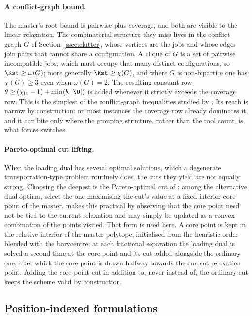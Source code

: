 \paragraph{A conflict-graph bound.}
The master's root bound is pairwise plus coverage, and both are visible to the linear
relaxation. The combinatorial structure they miss lives in the conflict graph $G$ of
Section~\ref{ssec:clutter}, whose vertices are the jobs and whose edges join pairs
that cannot share a configuration. A clique of $G$ is a set of pairwise incompatible
jobs, which must occupy that many distinct configurations, so $\Kst\ge\omega(G)$; more
generally $\Kst\ge\chi(G)$, and where $G$ is non-bipartite one has $\chi(G)\ge3$ even
when $\omega(G)=2$. The resulting constant row
$\theta\ge(\chi_{\mathrm{lb}}-1)+\min(b,\lvert\U\rvert)$ is added whenever it strictly
exceeds the coverage row. This is the simplest of the conflict-graph inequalities studied by
\citet{Atamturk2000}. Its reach is narrow by construction: on most instances the
coverage row already dominates it, and it can bite only where the grouping structure,
rather than the tool count, is what forces switches.

\paragraph{Pareto-optimal cut lifting.}
When the loading dual has several optimal solutions, which a degenerate
transportation-type problem routinely does, the cuts they yield are not equally
strong. Choosing the deepest is the Pareto-optimal cut of \citet{MagnantiWong1981}:
among the alternative dual optima, select the one maximising the cut's value at a fixed
interior core point of the master. \citet{Papadakos2008} makes this practical by
observing that the core point need not be tied to the current relaxation and may simply
be updated as a convex combination of the points visited. That form is used here. A
core point is kept in the relative interior of the master polytope, initialised from
the heuristic order blended with the barycentre; at each fractional separation the
loading dual is solved a second time at the core point and its cut added alongside the
ordinary one, after which the core point is drawn halfway towards the current
relaxation point. Adding the core-point cut in addition to, never instead of, the
ordinary cut keeps the scheme valid by construction.

\subsection{Position-indexed formulations}\label{ssec:pos}

